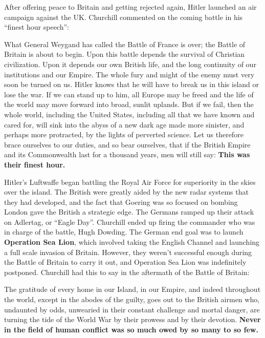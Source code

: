 After offering peace to Britain and getting rejected again, Hitler launched an air campaign against the UK\@.
Churchill commented on the coming battle in his ``finest hour speech'':
\begin{quoting}
  What General Weygand has called the Battle of France is over;
  the Battle of Britain is about to begin.
  Upon this battle depends the survival of Christian civilization.
  Upon it depends our own British life, and the long continuity of our institutions and our Empire.
  The whole fury and might of the enemy must very soon be turned on us.
  Hitler knows that he will have to break us in this island or lose the war.
  If we can stand up to him,
  all Europe may be freed and the life of the world may move forward into broad, sunlit uplands.
  But if we fail, then the whole world, including the United States,
  including all that we have known and cared for, will sink into the abyss of a new dark age made more sinister,
  and perhaps more protracted, by the lights of perverted science.
  Let us therefore brace ourselves to our duties, and so bear ourselves,
  that if the British Empire and its Commonwealth last for a thousand years, men will still say:
  \textbf{This was their finest hour.}
\end{quoting}

Hitler's Luftwaffe began battling the Royal Air Force for superiority in the skies over the island.
The British were greatly aided by the new radar systems that they had developed,
and the fact that Goering was so focused on bombing London gave the British a strategic edge.
The Germans ramped up their attack on Adlertag, or ``Eagle Day''.
Churchill ended up firing the commander who was in charge of the battle, Hugh Dowding.
The German end goal was to launch \textbf{Operation Sea Lion},
which involved taking the English Channel and launching a full scale invasion of Britain.
However, they weren't successful enough during the Battle of Britain to carry it out,
and Operation Sea Lion was indefinitely postponed.
Churchill had this to say in the aftermath of the Battle of Britain:
\begin{quoting}
  The gratitude of every home in our Island, in our Empire, and indeed throughout the world,
  except in the abodes of the guilty, goes out to the British airmen who,
  undaunted by odds, unwearied in their constant challenge and mortal danger,
  are turning the tide of the World War by their prowess and by their devotion.
  \textbf{Never in the field of human conflict was so much owed by so many to so few.}
\end{quoting}

